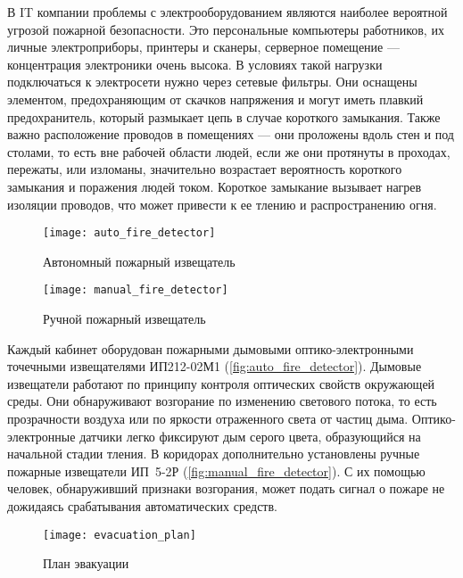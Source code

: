 В IT компании проблемы с электрооборудованием являются наиболее вероятной угрозой пожарной безопасности. Это персональные компьютеры работников, их личные электроприборы, принтеры и сканеры, серверное помещение --- концентрация электроники очень высока. В условиях такой нагрузки подключаться к электросети нужно через сетевые фильтры. Они оснащены элементом, предохраняющим от скачков напряжения и могут иметь плавкий предохранитель, который размыкает цепь в случае короткого замыкания. Также важно расположение проводов в помещениях --- они проложены вдоль стен и под столами, то есть вне рабочей области людей, если же они протянуты в проходах, пережаты, или изломаны, значительно возрастает вероятность короткого замыкания и поражения людей током. Короткое замыкание вызывает нагрев изоляции проводов, что может привести к ее тлению и распространению огня.

\begin{figure}
  \begin{center}
    \texttt{[image: auto\_fire\_detector]}
    \caption{Автономный пожарный извещатель}
    \label{fig:auto_fire_detector}
  \end{center}
\end{figure}

\begin{figure}
  \begin{center}
    \texttt{[image: manual\_fire\_detector]}
    \caption{Ручной пожарный извещатель}
    \label{fig:manual_fire_detector}
  \end{center}
\end{figure}

Каждый кабинет оборудован пожарными дымовыми оптико-электронными точечными извещателями \mbox{ИП212-02М1} (\autoref{fig:auto_fire_detector}). Дымовые извещатели работают по принципу контроля оптических свойств окружающей среды. Они обнаруживают возгорание по изменению светового потока, то есть прозрачности воздуха или по яркости отраженного света от частиц дыма. Оптико-электронные датчики легко фиксируют дым серого цвета, образующийся на начальной стадии тления. В коридорах дополнительно установлены ручные пожарные извещатели \mbox{ИП 5-2Р} (\autoref{fig:manual_fire_detector}). С их помощью человек, обнаруживший признаки возгорания, может подать сигнал о пожаре не дожидаясь срабатывания автоматических средств.

\begin{figure}[h]
  \begin{center}
    \texttt{[image: evacuation\_plan]}
    \caption{План эвакуации}
    \label{fig:evacuation_plan}
  \end{center}
\end{figure}

